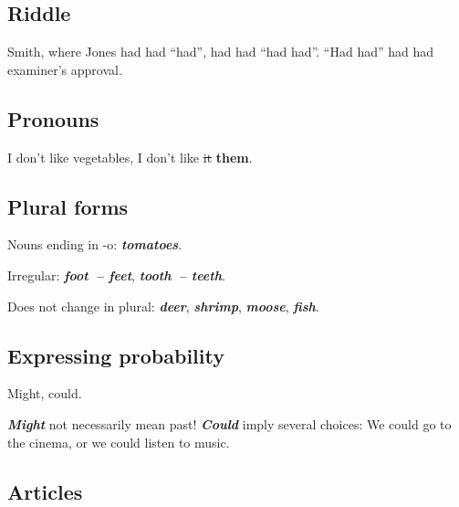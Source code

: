 \documentclass[10pt,a4paper]{article}
\newcommand\ex[1]{\textit{\textbf{{#1}}}}           %
\begin{document}
\subsection{Riddle}
Smith, where Jones had had ``had'', had had ``had had''. ``Had had'' had had examiner's approval.




\subsection{Pronouns}
I don’t like vegetables, I don't like \sout{it} \textbf{them}.



\subsection{Plural forms}
Nouns ending in -o: \ex{tomatoes}.

Irregular: \ex{foot~-- feet}, \ex{tooth~-- teeth}.

Does not change in plural: \ex{deer}, \ex{shrimp}, \ex{moose}, \ex{fish}.




\subsection{Expressing probability}
Might, could.

\ex{Might} not necessarily mean past! \ex{Could} imply several choices: We could go to the cinema, or we could listen to music.






\subsection{Articles}
\end{document}
